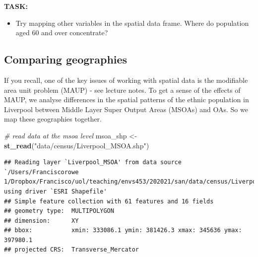 \documentclass[
]{book}
\newenvironment{Shaded}{\begin{snugshade}}{\end{snugshade}}
\newcommand{\CommentTok}[1]{\textcolor[rgb]{0.56,0.35,0.01}{\textit{#1}}}
\newcommand{\KeywordTok}[1]{\textcolor[rgb]{0.13,0.29,0.53}{\textbf{#1}}}
\newcommand{\NormalTok}[1]{#1}
\newcommand{\StringTok}[1]{\textcolor[rgb]{0.31,0.60,0.02}{#1}}
\providecommand{\tightlist}{%
  \setlength{\itemsep}{0pt}\setlength{\parskip}{0pt}}
\begin{document}
\textbf{TASK:}

\begin{itemize}
\tightlist
\item
  Try mapping other variables in the spatial data frame. Where do population aged 60 and over concentrate?
\end{itemize}

\hypertarget{comparing-geographies}{%
\subsection{Comparing geographies}\label{comparing-geographies}}

If you recall, one of the key issues of working with spatial data is the modifiable area unit problem (MAUP) - see lecture notes. To get a sense of the effects of MAUP, we analyse differences in the spatial patterns of the ethnic population in Liverpool between Middle Layer Super Output Areas (MSOAs) and OAs. So we map these geographies together.

\begin{Shaded}
\begin{Highlighting}[]
\CommentTok{# read data at the msoa level}
\NormalTok{msoa_shp <-}\StringTok{ }\KeywordTok{st_read}\NormalTok{(}\StringTok{"data/census/Liverpool_MSOA.shp"}\NormalTok{)}
\end{Highlighting}
\end{Shaded}

\begin{verbatim}
## Reading layer `Liverpool_MSOA' from data source `/Users/Franciscorowe 1/Dropbox/Francisco/uol/teaching/envs453/202021/san/data/census/Liverpool_MSOA.shp' using driver `ESRI Shapefile'
## Simple feature collection with 61 features and 16 fields
## geometry type:  MULTIPOLYGON
## dimension:      XY
## bbox:           xmin: 333086.1 ymin: 381426.3 xmax: 345636 ymax: 397980.1
## projected CRS:  Transverse_Mercator
\end{verbatim}
\end{document}
